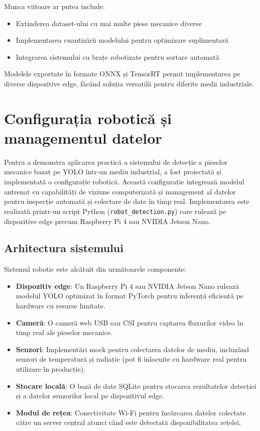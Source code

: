 \documentclass[12pt,a4paper]{article}
\begin{document}
Munca viitoare ar putea include:
\begin{itemize}
\item Extinderea dataset-ului cu mai multe piese mecanice diverse
\item Implementarea cuantizării modelului pentru optimizare suplimentară
\item Integrarea sistemului cu brațe robotizate pentru sortare automată
\end{itemize}

Modelele exportate în formate ONNX și TensorRT permit implementarea pe diverse dispozitive edge, făcând soluția versatilă pentru diferite medii industriale.

\section{Configurația robotică și managementul datelor}

Pentru a demonstra aplicarea practică a sistemului de detecție a pieselor mecanice bazat pe YOLO într-un mediu industrial, a fost proiectată și implementată o configurație robotică. Această configurație integrează modelul antrenat cu capabilități de viziune computerizată și management al datelor pentru inspecție automată și colectare de date în timp real. Implementarea este realizată printr-un script Python (\texttt{robot\_detection.py}) care rulează pe dispozitive edge precum Raspberry Pi 4 sau NVIDIA Jetson Nano.

\subsection{Arhitectura sistemului}

Sistemul robotic este alcătuit din următoarele componente:
\begin{itemize}
\item \textbf{Dispozitiv edge}: Un Raspberry Pi 4 sau NVIDIA Jetson Nano rulează modelul YOLO optimizat în format PyTorch pentru inferență eficientă pe hardware cu resurse limitate.
\item \textbf{Cameră}: O cameră web USB sau CSI pentru captarea fluxurilor video în timp real ale pieselor mecanice.
\item \textbf{Senzori}: Implementări mock pentru colectarea datelor de mediu, incluzând senzori de temperatură și radiație (pot fi înlocuite cu hardware real pentru utilizare în producție).
\item \textbf{Stocare locală}: O bază de date SQLite pentru stocarea rezultatelor detecției și a datelor senzorilor local pe dispozitivul edge.
\item \textbf{Modul de rețea}: Conectivitate Wi-Fi pentru încărcarea datelor colectate către un server central atunci când este detectată disponibilitatea rețelei.
\end{itemize}
\end{document}
